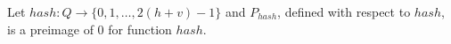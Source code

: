 %
%

Let $hash:Q\rightarrow\{0,1,\dots, 2(h+v)-1\}$ and $P_{hash}$, defined with respect to $hash$, is a preimage of $0$ for function $hash$.




